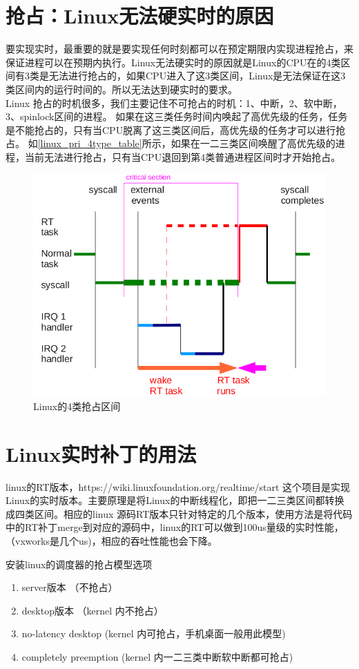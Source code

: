\section{抢占：Linux无法硬实时的原因}
要实现实时，最重要的就是要实现任何时刻都可以在预定期限内实现进程抢占，来保证进程可以在预期内执行。Linux无法硬实时的原因就是Linux的CPU在的4类区间有3类是无法进行抢占的，如果CPU进入了这3类区间，Linux是无法保证在这3类区间内的运行时间的。所以无法达到硬实时的要求。\\Linux
抢占的时机很多，我们主要记住不可抢占的时机：1、中断，2、软中断，3、spinlock区间的进程。
如果在这三类任务时间内唤起了高优先级的任务，任务是不能抢占的，只有当CPU脱离了这三类区间后，高优先级的任务才可以进行抢占。
如\ref{linux_pri_4type_table}所示，如果在一二三类区间唤醒了高优先级的进程，当前无法进行抢占，只有当CPU退回到第4类普通进程区间时才开始抢占。
\begin{figure}[H]
  \centering
  \includegraphics[width=12cm]{./figure/linux_rt_4type_preempt.png}
  \caption{Linux的4类抢占区间}\label{linux_rt_4type_preempt}
\end{figure}

\section{Linux实时补丁的用法}
linux的RT版本，https://wiki.linuxfoundation.org/realtime/start 这个项目是实现Linux的实时版本。主要原理是将Linux的中断线程化，即把一二三类区间都转换成四类区间。相应的linux 源码RT版本只针对特定的几个版本，使用方法是将代码中的RT补丁merge到对应的源码中，linux的RT可以做到100us量级的实时性能，（vxworks是几个us)，相应的吞吐性能也会下降。

安装linux的调度器的抢占模型选项
\begin{enumerate}
  \item server版本 （不抢占）
  \item desktop版本 （kernel 内不抢占）
  \item no-latency desktop (kernel 内可抢占，手机桌面一般用此模型)
  \item completely preemption (kernel 内一二三类中断软中断都可抢占)
\end{enumerate}


